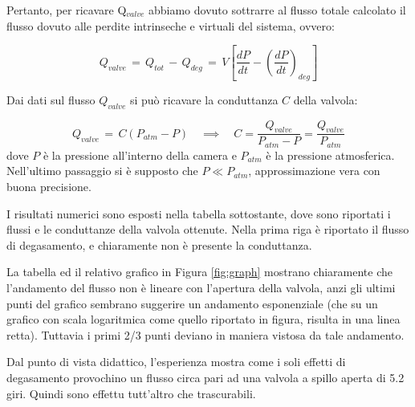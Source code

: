 Pertanto, per ricavare Q$_{valve}$ abbiamo dovuto sottrarre al flusso totale calcolato il flusso  dovuto alle perdite intrinseche e virtuali del sistema, ovvero:

\begin{equation}
	Q_{valve} \, = \, Q_{tot} \, - \, Q_{deg} \, = \, V \left[ \frac{dP}{dt} - \left(\frac{dP}{dt}\right)_{deg} \right]
\end{equation}

Dai dati sul flusso $Q_{valve}$ si può ricavare la conduttanza $C$ della valvola:

\begin{equation}
	Q_{valve} \, = \, C (P_{atm} - P) \quad \implies \quad C = \frac{Q_{valve}}{P_{atm} - P} = \frac{Q_{valve}}{P_{atm}}
\end{equation}
%
dove $P$ è la pressione all'interno della camera e $P_{atm}$ è la pressione atmosferica. Nell'ultimo passaggio si è supposto
che $P \ll P_{atm}$, approssimazione vera con buona precisione.

I risultati numerici sono esposti nella tabella sottostante, dove sono riportati i flussi e le conduttanze della valvola ottenute.
Nella prima riga è riportato il flusso di degasamento, e chiaramente non è presente la conduttanza.



La tabella ed il relativo grafico in Figura \ref{fig:graph} mostrano chiaramente che l'andamento del flusso non è lineare con
l'apertura della valvola, anzi gli ultimi punti del grafico sembrano suggerire un andamento esponenziale (che su un grafico
con scala logaritmica come quello riportato in figura, risulta in una linea retta). Tuttavia i primi 2/3
punti deviano in maniera vistosa da tale andamento.

Dal punto di vista didattico, l'esperienza mostra come i soli effetti di degasamento provochino un flusso circa pari ad una valvola a
spillo aperta di 5.2 giri. Quindi sono effettu tutt'altro che trascurabili.
